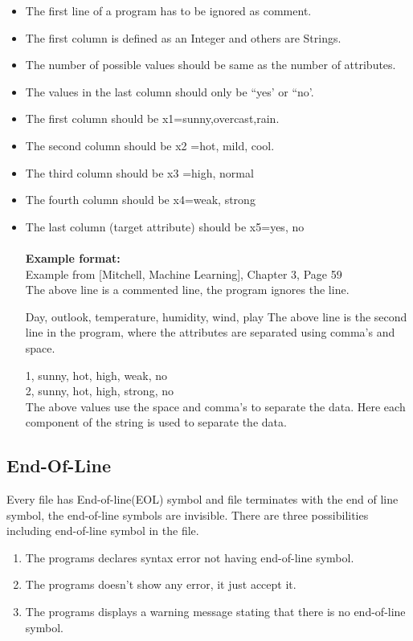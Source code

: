 \documentclass{report}
\begin{document}
\begin{itemize}

\item The first line of a program has to be ignored as comment.
\item The first column is defined as an Integer and others are Strings.
\item The number of possible values should be same as the number of attributes.
\item The values in the last column should only be ``yes' or ``no'.
\item The first column should be x1={sunny,overcast,rain}.
\item The second column should be x2 ={hot, mild, cool}.
\item The third column should be x3 ={high, normal}
\item The fourth column should be x4={weak, strong}
\item The last column (target attribute) should be x5={yes, no}\\\\


{\bf Example format:}\\
Example from [Mitchell, Machine Learning], Chapter 3, Page 59\\
The above line is a commented line, the program ignores the line.

Day, outlook, temperature, humidity, wind, play
The above line is the second line in the program, where the attributes are separated using comma's and space. 
 
1, sunny, hot, high, weak, no\\
2, sunny, hot, high, strong, no\\

The above values use the space and comma's to separate the data. Here each component of the string is used to separate the data.


\end{itemize}


\subsection{End-Of-Line}
\label{sec:Eol}

Every file has End-of-line(EOL) symbol and file terminates with the end of line symbol, the end-of-line symbols are invisible.
There are three possibilities including end-of-line symbol in the file.
\begin{enumerate}

\item The programs declares syntax error not having end-of-line symbol.
\item The programs doesn't show any error, it just accept it.
\item The programs displays a warning message stating that there is no end-of-line symbol.

\end{enumerate}
\end{document}
